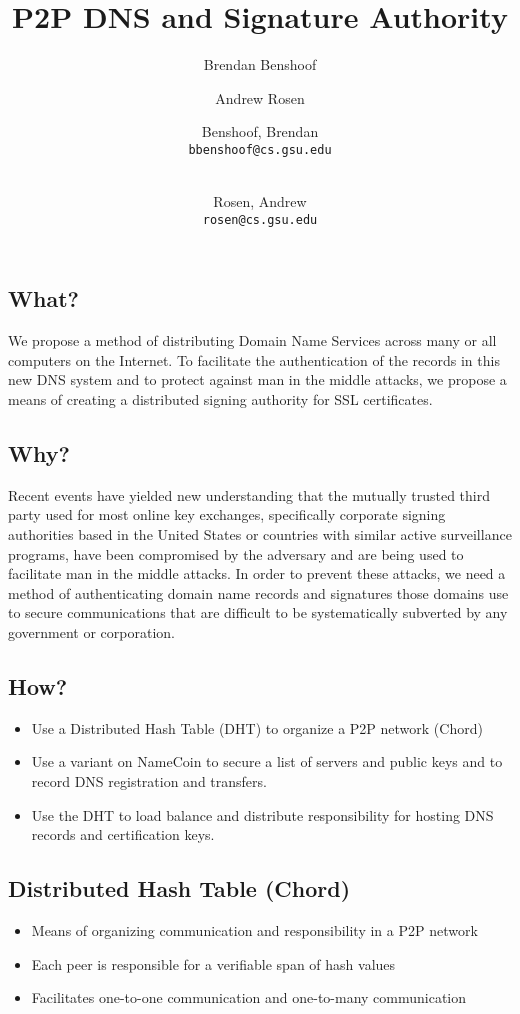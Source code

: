 \documentclass{IEEEtran}
\author{ Brendan Benshoof}
\author{Andrew Rosen}
\author{
  Benshoof, Brendan\\
  \texttt{bbenshoof@cs.gsu.edu}
  \and\\
  Rosen, Andrew\\
  \texttt{rosen@cs.gsu.edu}
}
\title{P2P DNS and Signature Authority}
\begin{document}
\maketitle
\subsection{What?}

We propose a method of distributing Domain Name Services across many or
all computers on the Internet. To facilitate the authentication of the
records in this new DNS system and to protect against man in the middle
attacks, we propose a means of creating a distributed signing authority
for SSL certificates.

\subsection{Why?}

Recent events have yielded new understanding that the mutually trusted
third party used for most online key exchanges, specifically corporate
signing authorities based in the United States or countries with similar
active surveillance programs, have been compromised by the adversary and
are being used to facilitate man in the middle attacks. In order to
prevent these attacks, we need a method of authenticating domain name
records and signatures those domains use to secure communications that
are difficult to be systematically subverted by any government or
corporation.

\subsection{How?}

\begin{itemize}
\item
  Use a Distributed Hash Table (DHT) to organize a P2P network (Chord)
\item
  Use a variant on NameCoin to secure a list of servers and public keys
  and to record DNS registration and transfers.
\item
  Use the DHT to load balance and distribute responsibility for hosting
  DNS records and certification keys.
\end{itemize}
\subsection{Distributed Hash Table (Chord)}

\begin{itemize}
\item
  Means of organizing communication and responsibility in a P2P network
\item
  Each peer is responsible for a verifiable span of hash values
\item
  Facilitates one-to-one communication and one-to-many communication
\end{itemize}
\end{document}
